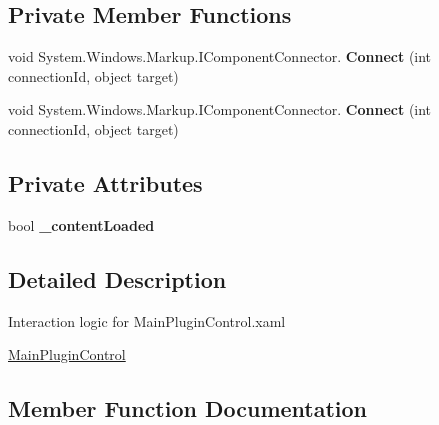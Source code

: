 \subsection*{Private Member Functions}
\begin{DoxyCompactItemize}
\item 
\mbox{\label{class_example_plugin1_1_1_main_plugin_control_add1a7c035c0572d72428ab2fe9e0fb9f}} 
void System.\+Windows.\+Markup.\+I\+Component\+Connector. {\bfseries Connect} (int connection\+Id, object target)
\item 
\mbox{\label{class_example_plugin1_1_1_main_plugin_control_add1a7c035c0572d72428ab2fe9e0fb9f}} 
void System.\+Windows.\+Markup.\+I\+Component\+Connector. {\bfseries Connect} (int connection\+Id, object target)
\end{DoxyCompactItemize}
\subsection*{Private Attributes}
\begin{DoxyCompactItemize}
\item 
\mbox{\label{class_example_plugin1_1_1_main_plugin_control_ac21a036ba9dbb806933cb25a0ba94f10}} 
bool {\bfseries \+\_\+content\+Loaded}
\end{DoxyCompactItemize}


\subsection{Detailed Description}
Interaction logic for Main\+Plugin\+Control.\+xaml 

\mbox{\hyperlink{class_example_plugin1_1_1_main_plugin_control}{Main\+Plugin\+Control}} 

\subsection{Member Function Documentation}
\mbox{\label{class_example_plugin1_1_1_main_plugin_control_a23d923a8762cd34a0c6403ee994427d4}} 
